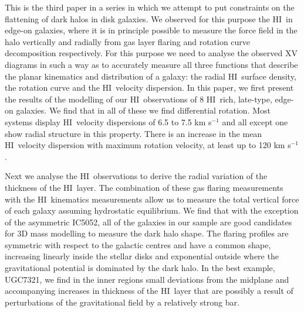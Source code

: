 \documentclass[traditabstract]{aa} %
\newcommand\HI{H{\small I}}
\begin{document}
  \abstract
   {This is the third paper in a series in which we attempt to put
constraints on the flattening of dark halos in disk galaxies. We
observed for this purpose the \HI\ in edge-on galaxies, where it is in principle
possible to measure the force field in the halo vertically and radially
from gas layer flaring and rotation curve decomposition respectively.  
For this purpose we need to analyse the observed XV diagrams in such a
way as to accurately measure all three functions that describe the
planar kinematics and distribution of a galaxy: the radial \HI\ surface
density, the rotation curve and the \HI\ velocity dispersion. 
In this  paper, we first present the results of the modelling
of our \HI\ observations of 8 \HI\ rich, late-type, edge-on galaxies. We find that
in all of these we find differential rotation. Most systems display \HI\ velocity
dispersions of 6.5 to 7.5 km s$^{-1}$ and all except one show radial structure in 
this property. There is an increase in the mean \HI\ velocity dispersion with 
maximum rotation velocity, at least up to 120 km s$^{-1}$. 

Next we analyse the \HI\ observations to derive the radial variation of
the thickness of the \HI\ layer. The combination of these gas flaring 
measurements with the \HI\ kinematics measurements allow 
us to measure the total vertical force of each galaxy assuming
hydrostatic equilibrium. We find that with the exception of the 
asymmetric IC5052,
all of the galaxies in our sample are good candidates for 3D mass
modelling to measure the dark halo shape. The flaring profiles are symmetric
with respect to the galactic centres and have a common shape, increasing
linearly inside the stellar disks and exponential outside where the gravitational
potential is dominated by the dark halo. In the best example, UGC7321, we find
in the inner regions
small deviations from the midplane and accompanying increases in thickness of the
\HI\ layer that are  possibly a result of perturbations of the
gravitational field by a relatively strong bar.
}
   {}


   \maketitle
%
\end{document}
